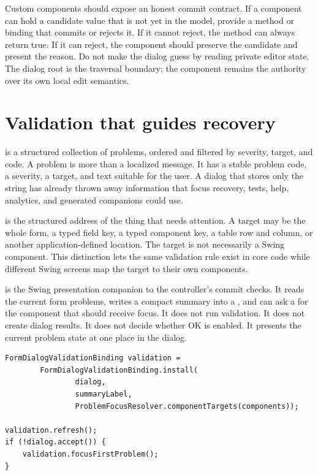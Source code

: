 Custom components should expose an honest commit contract. If a component can
hold a candidate value that is not yet in the model, provide a method or binding
that commits or rejects it. If it cannot reject, the method can always return
true. If it can reject, the component should preserve the candidate and present
the reason. Do not make the dialog guess by reading private editor state. The
dialog root is the traversal boundary; the component remains the authority over
its own local edit semantics.

\section{Validation that guides recovery}

 is a structured collection of problems,
ordered and filtered by severity, target, and code. A problem is more than a
localized message. It has a stable problem code, a severity, a target, and
text suitable for the user. A dialog that stores only the string
 has already thrown away information that focus
recovery, tests, help, analytics, and generated companions could use.

 is the structured address of the
thing that needs attention. A target may be the whole form, a typed field key,
a typed component key, a table row and column, or another application-defined
location. The target is not necessarily a Swing component. This distinction
lets the same validation rule exist in core code while different Swing screens
map the target to their own components.

 is the Swing presentation companion to the
controller's commit checks. It reads the current form problems, writes a compact
summary into a , and can ask a  for the
component that should receive focus. It does not run validation. It does not
create dialog results. It does not decide whether OK is enabled. It presents
the current problem state at one place in the dialog.

\begin{lstlisting}[caption={Validation summary and focus binding.}]
FormDialogValidationBinding validation =
        FormDialogValidationBinding.install(
                dialog,
                summaryLabel,
                ProblemFocusResolver.componentTargets(components));

validation.refresh();
if (!dialog.accept()) {
    validation.focusFirstProblem();
}
\end{lstlisting}

